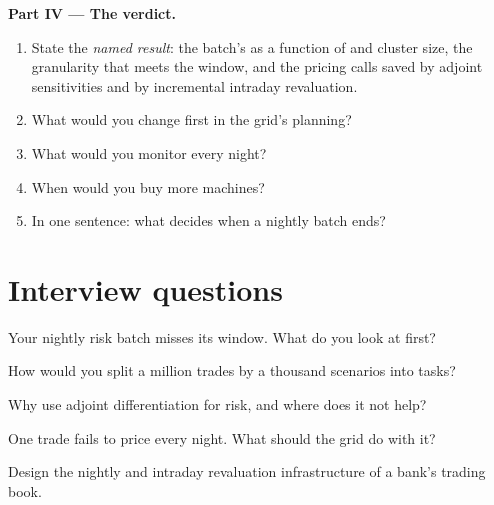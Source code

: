 \begin{problem}
\medskip\noindent\textbf{Part IV --- The verdict.}
\begin{enumerate}[resume]
\item State the \emph{named result}: the batch's  as a function of  and cluster size, the granularity that meets the
window, and the pricing calls saved by adjoint sensitivities and by incremental intraday revaluation.
\item What would you change first in the grid's planning?
\item What would you monitor every night?
\item When would you buy more machines?
\item In one sentence: what decides when a nightly batch ends?
\end{enumerate}
\end{problem}

\section{Interview questions}

\begin{interviewq}\label{iq:pl:the-risk-grid:1}
Your nightly risk batch misses its window. What do you look at first?
\end{interviewq}

\begin{interviewq}\label{iq:pl:the-risk-grid:2}
How would you split a million trades by a thousand scenarios into tasks?
\end{interviewq}

\begin{interviewq}\label{iq:pl:the-risk-grid:3}
Why use adjoint differentiation for risk, and where does it not help?
\end{interviewq}

\begin{interviewq}\label{iq:pl:the-risk-grid:4}
One trade fails to price every night. What should the grid do with it?
\end{interviewq}

\begin{interviewq}\label{iq:pl:the-risk-grid:5}
Design the nightly and intraday revaluation infrastructure of a bank's trading book.
\end{interviewq}
